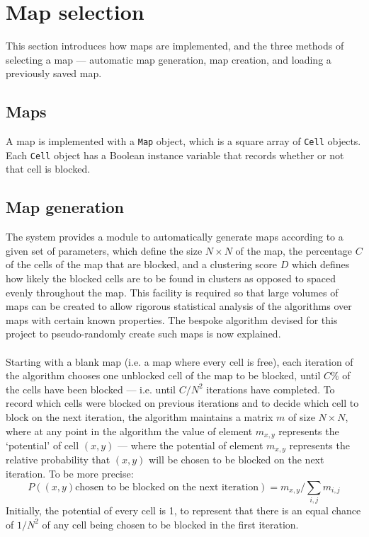 \documentclass[12pt,notitlepage]{report}
\begin{document}
\section{Map selection}

This section introduces how maps are implemented, and the three methods of selecting a map --- automatic map generation, map creation, and loading a previously saved map.\\

\subsection{Maps}
A map is implemented with a {\tt Map} object, which is a square array of {\tt Cell} objects. Each {\tt Cell} object has a Boolean instance variable that records whether or not that cell is blocked.

\subsection{Map generation}
The system provides a module to automatically generate maps according to a given set of parameters, which define the size $N \times N$ of the map, the percentage $C$ of the cells of the map that are blocked, and a clustering score $D$ which defines how likely the blocked cells are to be found in clusters as opposed to spaced evenly throughout the map. This facility is required so that large volumes of maps can be created to allow rigorous statistical analysis of the algorithms over maps with certain known properties. The bespoke algorithm devised for this project to pseudo-randomly create such maps is now explained.\\

\\
\noindent
Starting with a blank map (i.e. a map where every cell is free), each iteration of the algorithm chooses one unblocked cell of the map to be blocked, until $C\%$ of the cells have been blocked --- i.e. until $C/N^{2}$ iterations have completed. To record which cells were blocked on previous iterations and to decide which cell to block on the next iteration, the algorithm maintains a matrix $m$ of size $N \times N$, where at any point in the algorithm the value of element $m_{x,y}$ represents the `potential' of cell $(x,y)$ --- where the potential of element $m_{x,y}$ represents the relative probability that $(x,y)$ will be chosen to be blocked on the next iteration. To be more precise: 
\begin{equation}
P((x,y) \mbox{chosen to be blocked on the next iteration}) = m_{x,y}/\sum\limits_{i,j} m_{i,j}
\end{equation}
\noindent
Initially, the potential of every cell is 1, to represent that there is an equal chance of $1/N^{2}$ of any cell being chosen to be blocked in the first iteration.\\
\end{document}
